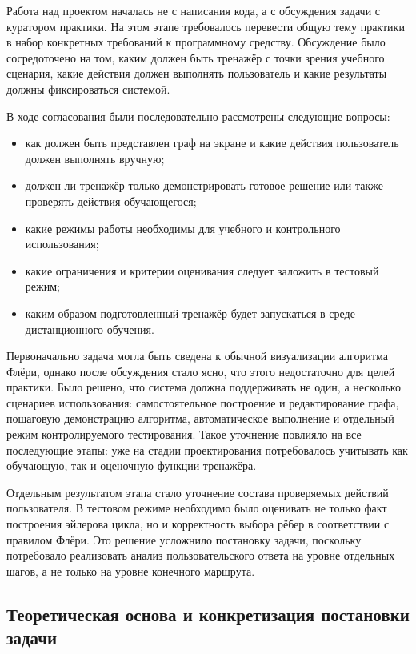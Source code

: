 \documentclass[a4paper,12pt]{extarticle}
\begin{document}
Работа над проектом началась не с написания кода, а с обсуждения задачи с куратором практики. На этом этапе требовалось перевести общую тему практики в набор конкретных требований к программному средству. Обсуждение было сосредоточено на том, каким должен быть тренажёр с точки зрения учебного сценария, какие действия должен выполнять пользователь и какие результаты должны фиксироваться системой.

В ходе согласования были последовательно рассмотрены следующие вопросы:
\begin{itemize}
  \item как должен быть представлен граф на экране и какие действия пользователь должен выполнять вручную;
  \item должен ли тренажёр только демонстрировать готовое решение или также проверять действия обучающегося;
  \item какие режимы работы необходимы для учебного и контрольного использования;
  \item какие ограничения и критерии оценивания следует заложить в тестовый режим;
  \item каким образом подготовленный тренажёр будет запускаться в среде дистанционного обучения.
\end{itemize}

Первоначально задача могла быть сведена к обычной визуализации алгоритма Флёри, однако после обсуждения стало ясно, что этого недостаточно для целей практики. Было решено, что система должна поддерживать не один, а несколько сценариев использования: самостоятельное построение и редактирование графа, пошаговую демонстрацию алгоритма, автоматическое выполнение и отдельный режим контролируемого тестирования. Такое уточнение повлияло на все последующие этапы: уже на стадии проектирования потребовалось учитывать как обучающую, так и оценочную функции тренажёра.

Отдельным результатом этапа стало уточнение состава проверяемых действий пользователя. В тестовом режиме необходимо было оценивать не только факт построения эйлерова цикла, но и корректность выбора рёбер в соответствии с правилом Флёри. Это решение усложнило постановку задачи, поскольку потребовало реализовать анализ пользовательского ответа на уровне отдельных шагов, а не только на уровне конечного маршрута.

\subsection{Теоретическая основа и конкретизация постановки задачи}
\end{document}
